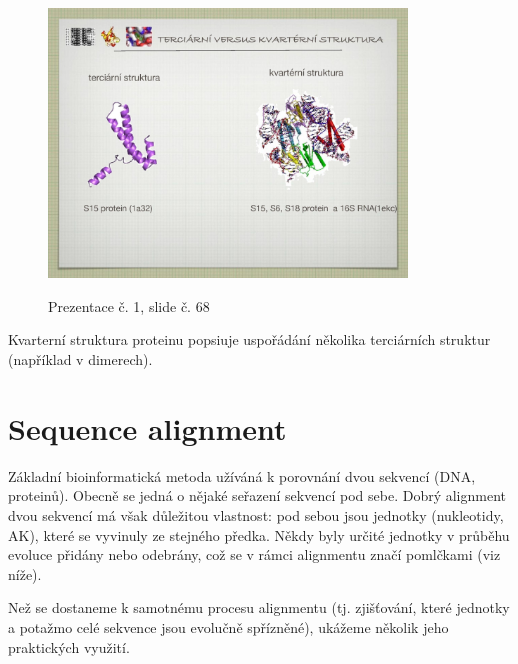 \documentclass[DIV=8]{scrreprt}
\begin{document}
\begin{figure}
    \caption{Prezentace č. 1, slide č. 68}
    \includegraphics[width=0.85\textwidth]{slides-1/slide-68.jpg}
    \centering
    \label{slides-1-slide-68}
\end{figure}

Kvarterní struktura proteinu popsiuje uspořádání několika terciárních struktur (například v dimerech).

\chapter{Sequence alignment} \label{Sequence alignment}


Základní bioinformatická metoda užíváná k porovnání dvou sekvencí (DNA, proteinů). Obecně se jedná o nějaké seřazení sekvencí pod sebe. Dobrý alignment dvou sekvencí má však důležitou vlastnost: pod sebou jsou jednotky (nukleotidy, AK), které se vyvinuly ze stejného předka. Někdy byly určité jednotky v průběhu evoluce přidány nebo odebrány, což se v rámci alignmentu značí pomlčkami (viz níže).

Než se dostaneme k samotnému procesu alignmentu (tj. zjišťování, které jednotky a potažmo celé sekvence jsou evolučně spřízněné), ukážeme několik jeho praktických využití.
\end{document}
